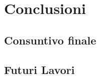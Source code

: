 \chapter{Conclusioni}
\label{cap:conclusioni}

\section{Consuntivo finale}

\section{Futuri Lavori}
